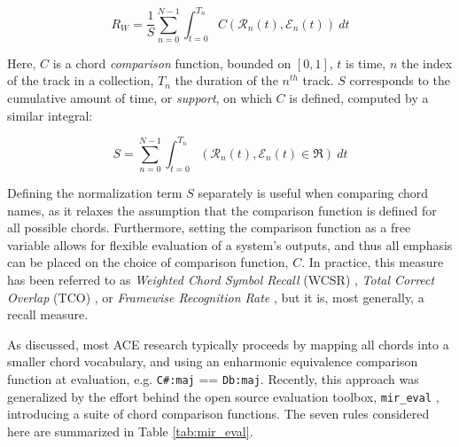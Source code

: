 \begin{equation}
\label{eq:recall_micro}
R_{W} = \frac{1}{S}\sum_{n=0}^{N-1}\int_{t=0}^{T_n}C(\mathcal{R}_n(t), \mathcal{E}_n(t))~dt
\end{equation}

\noindent Here, $C$ is a chord \emph{comparison} function, bounded on $[0, 1]$, $t$ is time, $n$ the index of the track in a collection, $T_n$ the duration of the $n^{th}$ track. $S$ corresponds to the cumulative amount of time, or \emph{support}, on which $C$ is defined, computed by a similar integral:

\begin{equation}
S = \sum_{n=0}^{N-1}\int_{t=0}^{T_n}(\mathcal{R}_n(t), \mathcal{E}_n(t) \in \Re)~dt
\end{equation}

Defining the normalization term $S$ separately is useful when comparing chord names, as it relaxes the assumption that the comparison function is defined for all possible chords.
Furthermore, setting the comparison function as a free variable allows for flexible evaluation of a system's outputs, and thus all emphasis can be placed on the choice of comparison function, $C$.
In practice, this measure has been referred to as \emph{Weighted Chord Symbol Recall} (WCSR) \cite{Harte2010Towards}, \emph{Total Correct Overlap} (TCO) \cite{McVicar2013Machine}, or \emph{Framewise Recognition Rate} \cite{Cho2014Improved}, but it is, most generally, a recall measure.

As discussed, most ACE research typically proceeds by mapping all chords into a smaller chord vocabulary, and using an enharmonic equivalence comparison function at evaluation, e.g. \texttt{C\#:maj} == \texttt{Db:maj}.
Recently, this approach was generalized by the effort behind the open source evaluation toolbox, \texttt{mir\_eval} \cite{Raffel2014Eval}, introducing a suite of chord comparison functions.
The seven rules considered here are summarized in Table \ref{tab:mir_eval}.

